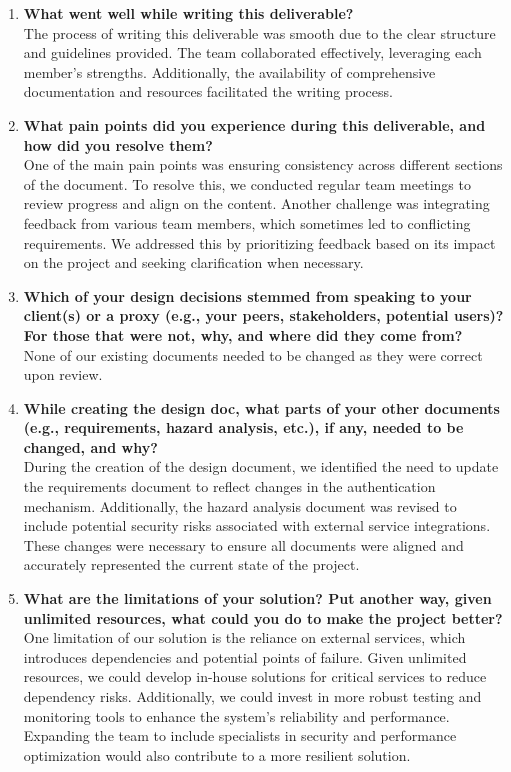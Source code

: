 \documentclass[12pt, titlepage]{article}
\begin{document}
\begin{enumerate}
  \item \textbf{What went well while writing this deliverable?}   \\
  The process of writing this deliverable was smooth due to the clear structure and guidelines provided. The team collaborated effectively, leveraging each member's strengths. Additionally, the availability of comprehensive documentation and resources facilitated the writing process.

  \item \textbf{What pain points did you experience during this deliverable, and how did you resolve them?}  \\
  One of the main pain points was ensuring consistency across different sections of the document. To resolve this, we conducted regular team meetings to review progress and align on the content. Another challenge was integrating feedback from various team members, which sometimes led to conflicting requirements. We addressed this by prioritizing feedback based on its impact on the project and seeking clarification when necessary.

  \item \textbf{Which of your design decisions stemmed from speaking to your client(s) or a proxy (e.g., your peers, stakeholders, potential users)? For those that were not, why, and where did they come from?}  \\
  None of our existing documents needed to be changed as they were correct upon review.

  \item \textbf{While creating the design doc, what parts of your other documents (e.g., requirements, hazard analysis, etc.), if any, needed to be changed, and why?}  \\
  During the creation of the design document, we identified the need to update the requirements document to reflect changes in the authentication mechanism. Additionally, the hazard analysis document was revised to include potential security risks associated with external service integrations. These changes were necessary to ensure all documents were aligned and accurately represented the current state of the project.

  \item \textbf{What are the limitations of your solution? Put another way, given unlimited resources, what could you do to make the project better?}  \\
  One limitation of our solution is the reliance on external services, which introduces dependencies and potential points of failure. Given unlimited resources, we could develop in-house solutions for critical services to reduce dependency risks. Additionally, we could invest in more robust testing and monitoring tools to enhance the system's reliability and performance. Expanding the team to include specialists in security and performance optimization would also contribute to a more resilient solution.


\end{enumerate}
\end{document}
